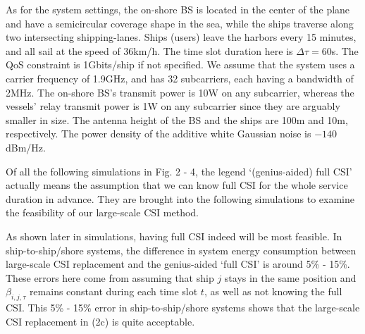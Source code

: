 \documentclass[conference]{IEEEtran}
\begin{document}
 
 As for the system settings, the on-shore BS is located in the center of the plane and have a semicircular coverage shape in the sea, while the ships traverse along two intersecting shipping-lanes. 
 Ships (users) leave the harbors every 15 minutes, and all sail at the speed of 36km/h. The time slot duration here is $\Delta \tau = 60$s. The QoS constraint is 1Gbits/ship if not specified. We assume that the system uses a carrier frequency of 1.9GHz, and has 32 subcarriers, each having a bandwidth of 2MHz. The on-shore BS's transmit power is 10W on any subcarrier, whereas the vessels' relay transmit power is 1W on any subcarrier since they are arguably smaller in size. The antenna height of the BS and the ships are 100m and 10m, respectively. The power density of the additive white Gaussian noise is ${-140}$dBm/Hz. 
 
 Of all the following simulations in Fig. 2 - 4, %
 the legend `(genius-aided) full CSI' actually means the assumption that we can know full CSI for the whole service duration in advance. %
 They are brought into the following simulations to examine the feasibility of our large-scale CSI method. 
 
 
 As shown later in simulations, having full CSI indeed will be most feasible. In ship-to-ship/shore systems, the difference in system energy consumption between large-scale CSI replacement and the genius-aided `full CSI' is around 5\% - 15\%. These errors here come from assuming that ship $j$ stays in the same position and $\beta _{i,j,\tau }$ remains constant during each time slot $t$, as well as not knowing the full CSI.
 This 5\% - 15\% error in ship-to-ship/shore systems shows that the large-scale CSI replacement in (2c) is quite acceptable. %
  
\end{document}

